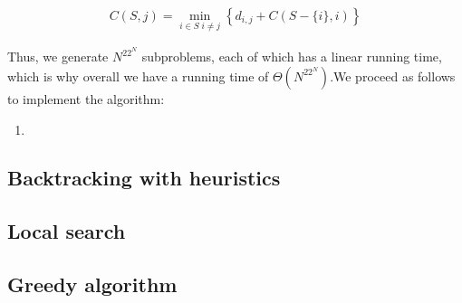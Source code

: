 \begin{align}
    C(S,j)=\min_{i\in S\;i\neq j}\left\{d_{i,j}+C(S-\{i\},i)\right\}
\end{align}

Thus, we generate $N^22^N$ subproblems, each of which has a linear running time, which is why overall we have a running time of $\Theta(N^22^N)$.We proceed as follows to implement the algorithm:

\begin{enumerate}
    \item 
\end{enumerate}

%

\subsection{Backtracking with heuristics}

%

\subsection{Local search}

%

\subsection{Greedy algorithm}

%